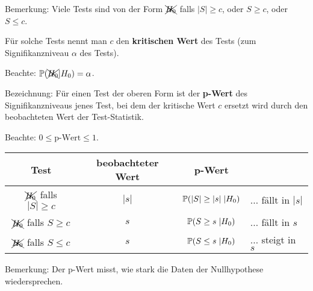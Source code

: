 \documentclass{tstextbook}
\begin{document}
\begin{remark}
	Bemerkung: Viele Tests sind von der Form $ \xcancel{H_0} $ falls $ |S| \ge c $, oder $ S \ge c $, oder $ S \le c $. 
	
	Für solche Tests nennt man $ c $ den \textbf{kritischen Wert} des Tests (zum Signifikanzniveau $ \alpha $ des Tests).
	
	Beachte: $ \mathbb P(\xcancel{H_0}|H_0) = \alpha $.
\end{remark}

\begin{remark}
	Bezeichnung: Für einen Test der oberen Form ist der \textbf{p-Wert} des Signifikanzniveaus jenes Test, bei dem der kritische Wert $ c $ ersetzt wird durch den beobachteten Wert der Test-Statistik. 
	
	Beachte: $ 0\le \text{p-Wert} \le 1 $.
\end{remark}

\begin{center}
\begin{tabular}{c|c|cl}
	Test 	& beobachteter Wert	& p-Wert 	& \\
	\midrule
	$ \xcancel{H_0} $ falls $ |S|\ge c $ & $ |s| $ & $ \mathbb P(|S|\ge|s|\;|H_0) $ & $\ldots$ fällt in $ |s| $ \\
	$ \xcancel{H_0} $ falls $ S\ge c $ & $ s $ & $ \mathbb P(S\ge s\;|H_0) $ & $\ldots$ fällt in $ s $ \\
	$ \xcancel{H_0} $ falls $ S\le c $ & $ s $ & $ \mathbb P(S\le s\;|H_0) $ & $\ldots$ steigt in $ s $	
\end{tabular}
\end{center}
\vspace{0.5cm}

\begin{remark}
	Bemerkung: Der p-Wert misst, wie stark die Daten der Nullhypothese wiedersprechen.
\end{remark}
\end{document}
